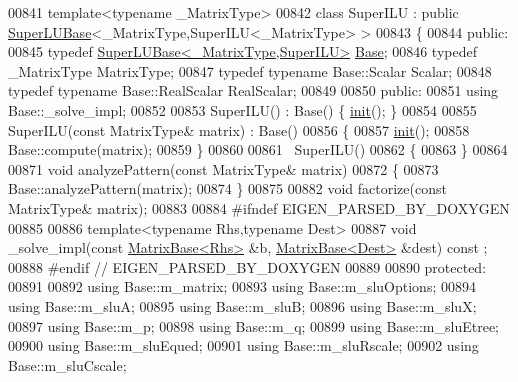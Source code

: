 \begin{DoxyCode}
00841 \textcolor{keyword}{template}<\textcolor{keyword}{typename} \_MatrixType>
00842 \textcolor{keyword}{class }SuperILU : \textcolor{keyword}{public} \hyperlink{class_eigen_1_1_super_l_u_base}{SuperLUBase}<\_MatrixType,SuperILU<\_MatrixType> >
00843 \{
00844   \textcolor{keyword}{public}:
00845     \textcolor{keyword}{typedef} \hyperlink{class_eigen_1_1_super_l_u_base}{SuperLUBase<\_MatrixType,SuperILU>} 
      \hyperlink{class_eigen_1_1_super_l_u_base}{Base};
00846     \textcolor{keyword}{typedef} \_MatrixType MatrixType;
00847     \textcolor{keyword}{typedef} \textcolor{keyword}{typename} Base::Scalar Scalar;
00848     \textcolor{keyword}{typedef} \textcolor{keyword}{typename} Base::RealScalar RealScalar;
00849 
00850   \textcolor{keyword}{public}:
00851     \textcolor{keyword}{using} Base::\_solve\_impl;
00852 
00853     SuperILU() : Base() \{ \hyperlink{structinit}{init}(); \}
00854 
00855     SuperILU(\textcolor{keyword}{const} MatrixType& matrix) : Base()
00856     \{
00857       \hyperlink{structinit}{init}();
00858       Base::compute(matrix);
00859     \}
00860 
00861     ~SuperILU()
00862     \{
00863     \}
00864     
00871     \textcolor{keywordtype}{void} analyzePattern(\textcolor{keyword}{const} MatrixType& matrix)
00872     \{
00873       Base::analyzePattern(matrix);
00874     \}
00875     
00882     \textcolor{keywordtype}{void} factorize(\textcolor{keyword}{const} MatrixType& matrix);
00883     
00884 \textcolor{preprocessor}{    #ifndef EIGEN\_PARSED\_BY\_DOXYGEN}
00885 
00886     \textcolor{keyword}{template}<\textcolor{keyword}{typename} Rhs,\textcolor{keyword}{typename} Dest>
00887     \textcolor{keywordtype}{void} \_solve\_impl(\textcolor{keyword}{const} \hyperlink{group___core___module_class_eigen_1_1_matrix_base}{MatrixBase<Rhs>} &b, \hyperlink{group___core___module_class_eigen_1_1_matrix_base}{MatrixBase<Dest>} &dest) \textcolor{keyword}{const}
      ;
00888 \textcolor{preprocessor}{    #endif // EIGEN\_PARSED\_BY\_DOXYGEN}
00889     
00890   \textcolor{keyword}{protected}:
00891     
00892     \textcolor{keyword}{using} Base::m\_matrix;
00893     \textcolor{keyword}{using} Base::m\_sluOptions;
00894     \textcolor{keyword}{using} Base::m\_sluA;
00895     \textcolor{keyword}{using} Base::m\_sluB;
00896     \textcolor{keyword}{using} Base::m\_sluX;
00897     \textcolor{keyword}{using} Base::m\_p;
00898     \textcolor{keyword}{using} Base::m\_q;
00899     \textcolor{keyword}{using} Base::m\_sluEtree;
00900     \textcolor{keyword}{using} Base::m\_sluEqued;
00901     \textcolor{keyword}{using} Base::m\_sluRscale;
00902     \textcolor{keyword}{using} Base::m\_sluCscale;

\end{DoxyCode}
